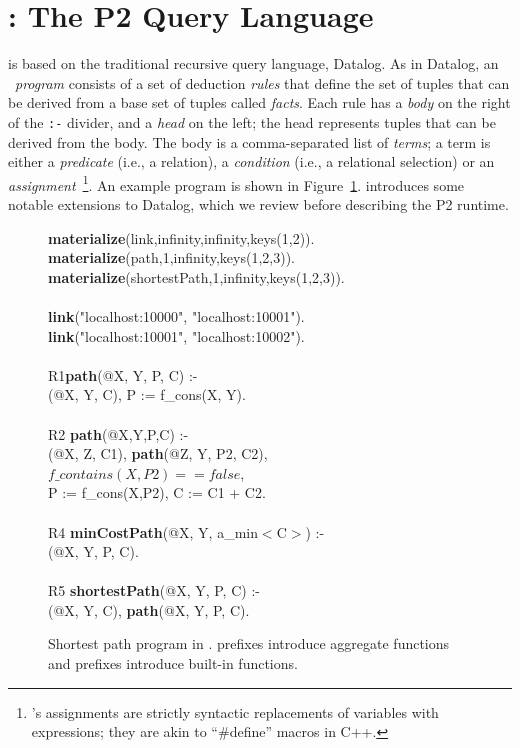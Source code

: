 \section{\OVERLOG: The P2 Query Language}
\label{ch:p2:sec:overlog}

\OVERLOG is based on the traditional recursive query language, Datalog.  As in
Datalog, an \OVERLOG~{\em program} consists of a set of deduction {\em rules}
that define the set of tuples that can be derived from a base set of tuples
called {\em facts}.  Each rule has a {\em body} on the right of the \texttt{:-}
divider, and a {\em head} on the left; the head represents tuples that can be
derived from the body.  The body is a comma-separated list of {\em terms}; a
term is either a {\em predicate} (i.e., a relation), a {\em condition} (i.e., a
relational selection) or an {\em assignment}~\footnote{\OVERLOG's assignments
are strictly syntactic replacements of variables with expressions; they are
akin to ``\#define'' macros in C++.}.  An example \OVERLOG program is shown in
Figure~\ref{ch:p2:fig:overlogSP}.  \OVERLOG introduces some notable extensions
to Datalog, which we review before describing the P2 runtime.

\begin{figure}
\ssp
\begin{boxedminipage}{\linewidth}
{\bf materialize}(link,infinity,infinity,keys(1,2)). \\
{\bf materialize}(path,1,infinity,keys(1,2,3)).  \\
{\bf materialize}(shortestPath,1,infinity,keys(1,2,3)). \\
\\
{\bf link}("localhost:10000", "localhost:10001"). \\
{\bf link}("localhost:10001", "localhost:10002"). \\
\\
R1{\bf path}(@X, Y, P, C) :- \\
(@X, Y, C), P := f\_cons(X, Y). \\
\\       
R2 {\bf path}(@X,Y,P,C) :- \\
(@X, Z, C1), {\bf path}(@Z, Y, P2, C2), \\
\datalogspace $f\_contains(X,P2) == false$, \\
\datalogspace P := f\_cons(X,P2), C := C1 + C2. \\ 
\\      
R4 {\bf minCostPath}(@X, Y, a\_min$<$C$>$) :-  \\
(@X, Y, P, C). \\
\\
R5 {\bf shortestPath}(@X, Y, P, C) :- \\
(@X, Y, C), {\bf path}(@X, Y, P, C).\\
\end{boxedminipage}
\caption{\label{ch:p2:fig:overlogSP}Shortest path program in \OVERLOG. 
prefixes introduce aggregate functions and  prefixes introduce
built-in functions.}
\end{figure}

